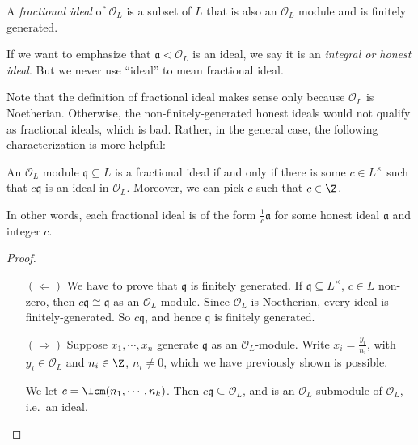 \documentclass[a4paper]{article}
\begin{document}
\begin{defi}
  A \emph{fractional ideal} of $\mathcal{O}_L$ is a subset of $L$ that is also an $\mathcal{O}_L$ module and is finitely generated.
\end{defi}

\begin{defi}
  If we want to emphasize that $\mathfrak{a} \lhd \mathcal{O}_L$ is an ideal, we say it is an \emph{integral or honest ideal}. But we never use ``ideal'' to mean fractional ideal.
\end{defi}

Note that the definition of fractional ideal makes sense only because $\mathcal{O}_L$ is Noetherian. Otherwise, the non-finitely-generated honest ideals would not qualify as fractional ideals, which is bad. Rather, in the general case, the following characterization is more helpful:

\begin{lemma}
  An $\mathcal{O}_L$ module $\mathfrak{q} \subseteq L$ is a fractional ideal if and only if there is some $c \in L^\times$ such that $c\mathfrak{q}$ is an ideal in $\mathcal{O}_L$. Moreover, we can pick $c$ such that $c \in \Z$.
\end{lemma}
In other words, each fractional ideal is of the form $\frac{1}{c} \mathfrak{a}$ for some honest ideal $\mathfrak{a}$ and integer $c$.
\begin{proof}\leavevmode
  \begin{itemize}
    \item[$(\Leftarrow)$] We have to prove that $\mathfrak{q}$ is finitely generated. If $\mathfrak{q} \subseteq L^\times$, $c \in L$ non-zero, then $c\mathfrak{q} \cong \mathfrak{q}$ as an $\mathcal{O}_L$ module. Since $\mathcal{O}_L$ is Noetherian, every ideal is finitely-generated. So $c\mathfrak{q}$, and hence $\mathfrak{q}$ is finitely generated.
    \item[$(\Rightarrow)$] Suppose $x_1, \cdots, x_n$ generate $\mathfrak{q}$ as an $\mathcal{O}_L$-module. Write $x_i = \frac{y_i}{n_i}$, with $y_i \in \mathcal{O}_L$ and $n_i \in \Z$, $n_i \not= 0$, which we have previously shown is possible.

      We let $c = \lcm(n_1, \cdots, n_k)$. Then $c\mathfrak{q} \subseteq \mathcal{O}_L$, and is an $\mathcal{O}_L$-submodule of $\mathcal{O}_L$, i.e.\ an ideal.
  \end{itemize}
\end{proof}
\end{document}

